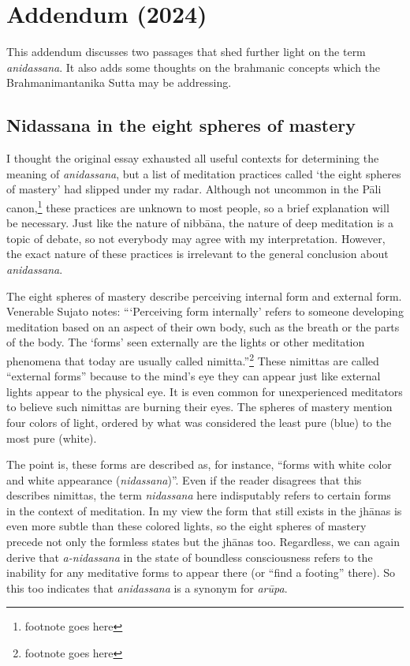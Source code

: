 \documentclass[10pt, openany]{book}
\begin{document}
\chapter{Addendum (2024)}
This addendum discusses two passages that shed further light on the term \textit{anidassana}. It also adds some thoughts on the brahmanic concepts which the Brahmanimantanika Sutta may be addressing.




\section{Nidassana in the eight spheres of mastery}
I thought the original essay exhausted all useful contexts for determining the meaning of \textit{anidassana}, but a list of meditation practices called ‘the eight spheres of mastery’ had slipped under my radar. Although not uncommon in the Pāli canon,\footnote{footnote goes here} these practices are unknown to most people, so a brief explanation will be necessary. Just like the nature of nibbāna, the nature of deep meditation is a topic of debate, so not everybody may agree with my interpretation. However, the exact nature of these practices is irrelevant to the general conclusion about \textit{anidassana}.


The eight spheres of mastery describe perceiving internal form and external form. Venerable Sujato notes: “‘Perceiving form internally’ refers to someone developing meditation based on an aspect of their own body, such as the breath or the parts of the body. The ‘forms’ seen externally are the lights or other meditation phenomena that today are usually called nimitta.”\footnote{footnote goes here} These nimittas are called “external forms” because to the mind’s eye they can appear just like external lights appear to the physical eye. It is even common for unexperienced meditators to believe such nimittas are burning their eyes. The spheres of mastery mention four colors of light, ordered by what was considered the least pure (blue) to the most pure (white).


The point is, these forms are described as, for instance, “forms with white color and white appearance (\textit{nidassana})”. Even if the reader disagrees that this describes nimittas, the term \textit{nidassana} here indisputably refers to certain forms in the context of meditation. In my view the form that still exists in the jhānas is even more subtle than these colored lights, so the eight spheres of mastery precede not only the formless states but the jhānas too. Regardless, we can again derive that \textit{a-nidassana} in the state of boundless consciousness refers to the inability for any meditative forms to appear there (or “find a footing” there). So this too indicates that \textit{anidassana} is a synonym for \textit{arūpa}.
\end{document}
